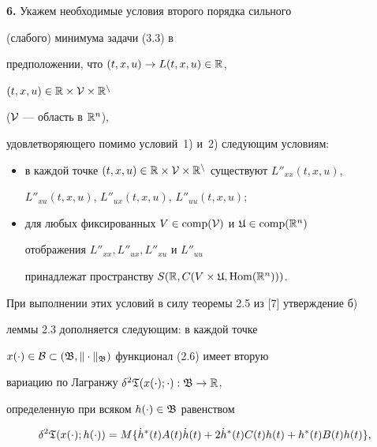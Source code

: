 \addtocounter{section}{1}


\setcounter{equation}{0}


\setcounter{thms}{0}


\setcounter{notes}{0}








{\bf 6.} Укажем необходимые условия второго порядка сильного


(слабого) минимума задачи (3.3) в


предположении, что $(t,x,u)\to L(t,x,u)\in\Bbb R$,


$(t,x,u)\in\Bbb R\times\cal V\times\Bbb R^n$


($\cal V$ --- область в $\Bbb R^n$),


удовлетворяющего помимо условий~1) и~2) следующим условиям:


\begin{itemize}


\item[3)] в каждой точке $(t,x,u)\in \Bbb R\times\cal V\times\Bbb


R^n$ существуют $L''_{xx}(t,x,u)$,


$L''_{xu}(t,x,u)$, $L''_{ux}(t,x,u)$, $L''_{uu}(t,x,u);$


\item[4)] для любых фиксированных $V\in\comp(\cal V)$ и $\frak


U\in\comp(\Bbb R^n)$


отображения $L''_{xx}, L''_{ux}, L''_{xu}$ и $L''_{uu}$


принадлежат пространству $S(\Bbb R,C(V\times\frak U,\operatorname{Hom}(\Bbb R^n)))$.


\end{itemize}





При выполнении этих условий в силу теоремы 2.5 из [7] утверждение б)


леммы 2.3 дополняется следующим: в каждой точке


$x(\cdot)\in\cal B\subset(\frak


B,\|\cdot\|_{\frak B})$ функционал (2.6) имеет вторую


вариацию по Лагранжу $\delta^2\frak


T(x(\cdot);\cdot):\frak B\to\Bbb R$,


определенную при всяком $h(\cdot)\in\frak B$ равенством


\begin{equation}


\delta^{2}{\frak T}(x(\cdot);h(\cdot))=


M\{\dot{h}^{*}(t)A(t)\dot h(t)+2\dot{h}^{*}(t)C(t)h(t)+


h^{*}(t)B(t)h(t)\},


\end{equation}


